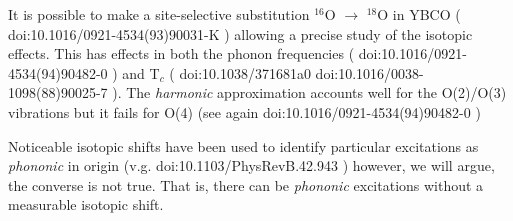 It is possible to make a site-selective substitution $^{16}$O $\rightarrow$ $^{18}$O in YBCO ( doi:10.1016/0921-4534(93)90031-K ) allowing a precise study of the isotopic effects. This has effects in both the phonon frequencies ( doi:10.1016/0921-4534(94)90482-0 ) and T$_{c}$ ( doi:10.1038/371681a0 doi:10.1016/0038-1098(88)90025-7 ). The \textit{harmonic} approximation accounts well for the O(2)/O(3) vibrations but it fails for O(4) (see again doi:10.1016/0921-4534(94)90482-0 )

Noticeable isotopic shifts have been used to identify particular excitations as \textit{phononic} in origin (v.g.  doi:10.1103/PhysRevB.42.943 ) however, we will argue, the converse is not true. That is, there can be \textit{phononic} excitations without a measurable isotopic shift.

